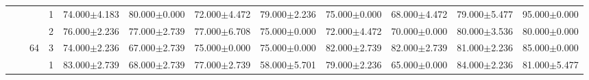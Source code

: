 \begin{table}[htpb]
{\begin{tabular}{c|c|c|c|rr|rr|rr|rr}
                                 &                                                                                 &                                                                                        & 1                                                                                         & 74.000$\pm$4.183                        & 80.000$\pm$0.000                        & 72.000$\pm$4.472                        & 79.000$\pm$2.236                        & 75.000$\pm$0.000                         & 68.000$\pm$4.472                         & 79.000$\pm$5.477                        & 95.000$\pm$0.000                       \\
                                 &                                                                                 &                                                                                        & 2                                                                                         & 76.000$\pm$2.236                        & 77.000$\pm$2.739                        & 77.000$\pm$6.708                        & 75.000$\pm$0.000                        & 72.000$\pm$4.472                         & 70.000$\pm$0.000                         & 80.000$\pm$3.536                        & 80.000$\pm$0.000                       \\
                                 &                                                                                 & \multirow{-3}{*}{64}                                                                   & 3                                                                                         & 74.000$\pm$2.236                        & 67.000$\pm$2.739                        & 75.000$\pm$0.000                        & 75.000$\pm$0.000                        & 82.000$\pm$2.739                         & 82.000$\pm$2.739                         & 81.000$\pm$2.236                        & 85.000$\pm$0.000                       \\ \cline{3-12} 
                                 &                                                                                 &                                                                                        & 1                                                                                         & 83.000$\pm$2.739                        & 68.000$\pm$2.739                        & 77.000$\pm$2.739                        & 58.000$\pm$5.701                        & 79.000$\pm$2.236                         & 65.000$\pm$0.000                         & 84.000$\pm$2.236                        & 81.000$\pm$5.477                       \\

\end{tabular}}
\end{table}
